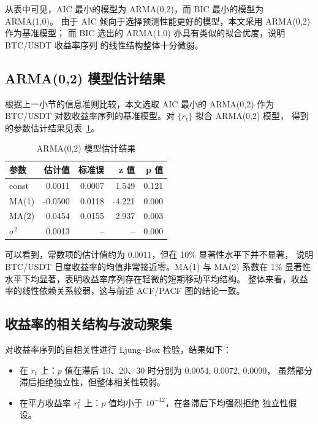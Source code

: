 \documentclass[12pt]{article}
\theoremstyle{definition}
\begin{document}
从表中可见，AIC 最小的模型为 ARMA(0,2)，而 BIC 最小的模型为 ARMA(1,0)。
由于 AIC 倾向于选择预测性能更好的模型，本文采用 ARMA(0,2) 作为基准模型；
而 BIC 选出的 ARMA(1,0) 亦具有类似的拟合优度，说明 BTC/USDT 收益率序列
的线性结构整体十分微弱。

\subsection{ARMA(0,2) 模型估计结果}

根据上一小节的信息准则比较，本文选取 AIC 最小的 ARMA(0,2) 作为
BTC/USDT 对数收益率序列的基准模型。对 $\{r_t\}$ 拟合 ARMA(0,2) 模型，
得到的参数估计结果见表~\ref{tab:arma02}。

\begin{table}[h]
    \centering
    \caption{ARMA(0,2) 模型估计结果}
    \label{tab:arma02}
    \begin{tabular}{lrrrr}
        \toprule
        参数         & 估计值     & 标准误    & z 值    & p 值   \\
        \midrule
        const      & 0.0011  & 0.0007 & 1.549  & 0.121 \\
        MA(1)      & -0.0500 & 0.0118 & -4.221 & 0.000 \\
        MA(2)      & 0.0454  & 0.0155 & 2.937  & 0.003 \\
        $\sigma^2$ & 0.0013  & --     & --     & 0.000 \\
        \bottomrule
    \end{tabular}
\end{table}

可以看到，常数项的估计值约为 $0.0011$，但在 10\% 显著性水平下并不显著，
说明 BTC/USDT 日度收益率的均值非常接近零。MA(1) 与 MA(2) 系数在 1\%
显著性水平下均显著，表明收益率序列存在轻微的短期移动平均结构。
整体来看，收益率的线性依赖关系较弱，这与前述 ACF/PACF 图的结论一致。


\subsection{收益率的相关结构与波动聚集}

对收益率序列的自相关性进行 Ljung--Box 检验，结果如下：

\begin{itemize}
    \item 在 $r_t$ 上：$p$ 值在滞后 10、20、30 时分别为 0.0054, 0.0072, 0.0090，
          虽然部分滞后拒绝独立性，但整体相关性较弱。
    \item 在平方收益率 $r_t^2$ 上：$p$ 值均小于 $10^{-12}$，在各滞后下均强烈拒绝
          独立性假设。
\end{itemize}
\end{document}
